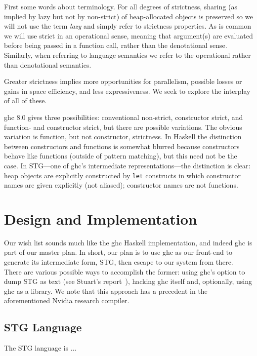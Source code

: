 \documentclass{llncs}
\begin{document}
First some words about terminology.  For all degrees of strictness, sharing
(as implied by lazy but not by non-strict) of heap-allocated objects is
preserved so we will not use the term \emph{lazy} and simply refer to
strictness properties.  As is common we will use strict in an operational
sense, meaning that argument(s) are evaluated before being passed in a
function call, rather than the denotational sense.  Similarly, when referring
to language semantics we refer to the operational rather than denotational
semantics.

Greater strictness implies more opportunities for parallelism, possible losses
or gains in space efficiency, and less expressiveness.  We seek to explore
the interplay of all of these.

ghc 8.0 gives three possibilities: conventional non-strict, constructor
strict, and function- and constructor strict, but there are possible
variations.  The obvious variation is function, but not constructor,
strictness.  In Haskell the distinction between constructors and functions is
somewhat blurred because constructors behave like functions (outside of
pattern matching), but this need not be the case.  In STG---one of ghc's
intermediate representations---the distinction is clear: heap objects are
explicitly constructed by \texttt{let} constructs in which constructor names
are given explicitly (not aliased); constructor names are not functions.

\section{Design and Implementation}

Our wish list sounds much like the ghc Haskell implementation, and indeed ghc
is part of our master plan.  In short, our plan is to use ghc as our front-end
to generate its intermediate form, STG, then escape to our system from there.
There are various possible ways to accomplish the former: using ghc's option
to dump STG as text (see Stuart's report~\cite{Stuart}), hacking ghc itself
and, optionally, using ghc as a library.  We note that this approach has
a precedent in the aforementioned Nvidia research compiler.

\subsection{STG Language}
\setlength{\tabcolsep}{5pt}

The STG language is ...
\end{document}
